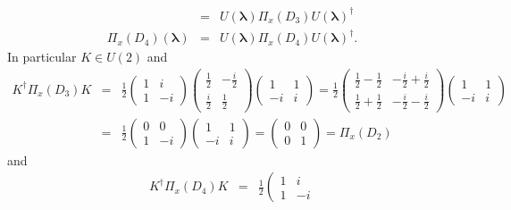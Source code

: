 \documentclass[aps,preprint]{revtex4}
\begin{document}
\begin{enumerate}
\begin{eqnarray}
&=&U\left( \mathbf{\lambda }\right) \mathcal{\Pi }_{x}\left( D_{3}\right)
U\left( \mathbf{\lambda }\right) ^{\dagger } \\
\mathcal{\Pi }_{x}\left( D_{4}\right) \left( \mathbf{\lambda }\right)
&=&U\left( \mathbf{\lambda }\right) \mathcal{\Pi }_{x}\left( D_{4}\right)
U\left( \mathbf{\lambda }\right) ^{\dagger }.
\end{eqnarray}%
In particular $K\in U\left( 2\right) $ and 
\begin{eqnarray}
K^{\dagger }\mathcal{\Pi }_{x}\left( D_{3}\right) K &=&\frac{1}{2}\left( 
\begin{array}{cc}
1 & i \\ 
1 & -i%
\end{array}%
\right) \left( 
\begin{array}{cc}
\frac{1}{2} & -\frac{i}{2} \\ 
\frac{i}{2} & \frac{1}{2}%
\end{array}%
\right) \left( 
\begin{array}{cc}
1 & 1 \\ 
-i & i%
\end{array}%
\right) =\frac{1}{2}\left( 
\begin{array}{cc}
\frac{1}{2}-\frac{1}{2} & -\frac{i}{2}+\frac{i}{2} \\ 
\frac{1}{2}+\frac{1}{2} & -\frac{i}{2}-\frac{i}{2}%
\end{array}%
\right) \left( 
\begin{array}{cc}
1 & 1 \\ 
-i & i%
\end{array}%
\right) \\
&=&\frac{1}{2}\left( 
\begin{array}{cc}
0 & 0 \\ 
1 & -i%
\end{array}%
\right) \left( 
\begin{array}{cc}
1 & 1 \\ 
-i & i%
\end{array}%
\right) =\left( 
\begin{array}{cc}
0 & 0 \\ 
0 & 1%
\end{array}%
\right) =\mathcal{\Pi }_{x}\left( D_{2}\right)
\end{eqnarray}%
and 
\begin{eqnarray}
K^{\dagger }\mathcal{\Pi }_{x}\left( D_{4}\right) K &=&\frac{1}{2}\left( 
\begin{array}{cc}
1 & i \\ 
1 & -i%

\end{array}
\end{eqnarray}
\end{enumerate}
\end{document}
